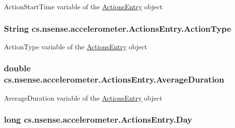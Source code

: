 Action\-Start\-Time variable of the \hyperlink{classcs_1_1nsense_1_1accelerometer_1_1_actions_entry}{Actions\-Entry} object \hypertarget{classcs_1_1nsense_1_1accelerometer_1_1_actions_entry_abcf8bc0a258a2a58c5039cf467e1e65b}{
\subsubsection[{Action\-Type}]{\setlength{\rightskip}{0pt plus 5cm}String cs.\-nsense.\-accelerometer.\-Actions\-Entry.\-Action\-Type\hspace{0.3cm}{\ttfamily [private]}}}\label{classcs_1_1nsense_1_1accelerometer_1_1_actions_entry_abcf8bc0a258a2a58c5039cf467e1e65b}
Action\-Type variable of the \hyperlink{classcs_1_1nsense_1_1accelerometer_1_1_actions_entry}{Actions\-Entry} object \hypertarget{classcs_1_1nsense_1_1accelerometer_1_1_actions_entry_a5f97f17d6fc01e680629f9f8b3c248c3}{
\subsubsection[{Average\-Duration}]{\setlength{\rightskip}{0pt plus 5cm}double cs.\-nsense.\-accelerometer.\-Actions\-Entry.\-Average\-Duration\hspace{0.3cm}{\ttfamily [private]}}}\label{classcs_1_1nsense_1_1accelerometer_1_1_actions_entry_a5f97f17d6fc01e680629f9f8b3c248c3}
Average\-Duration variable of the \hyperlink{classcs_1_1nsense_1_1accelerometer_1_1_actions_entry}{Actions\-Entry} object \hypertarget{classcs_1_1nsense_1_1accelerometer_1_1_actions_entry_adfa993675bbd906a553f20a2d7fbf343}{
\subsubsection[{Day}]{\setlength{\rightskip}{0pt plus 5cm}long cs.\-nsense.\-accelerometer.\-Actions\-Entry.\-Day\hspace{0.3cm}{\ttfamily [private]}}}\label{classcs_1_1nsense_1_1accelerometer_1_1_actions_entry_adfa993675bbd906a553f20a2d7fbf343}
